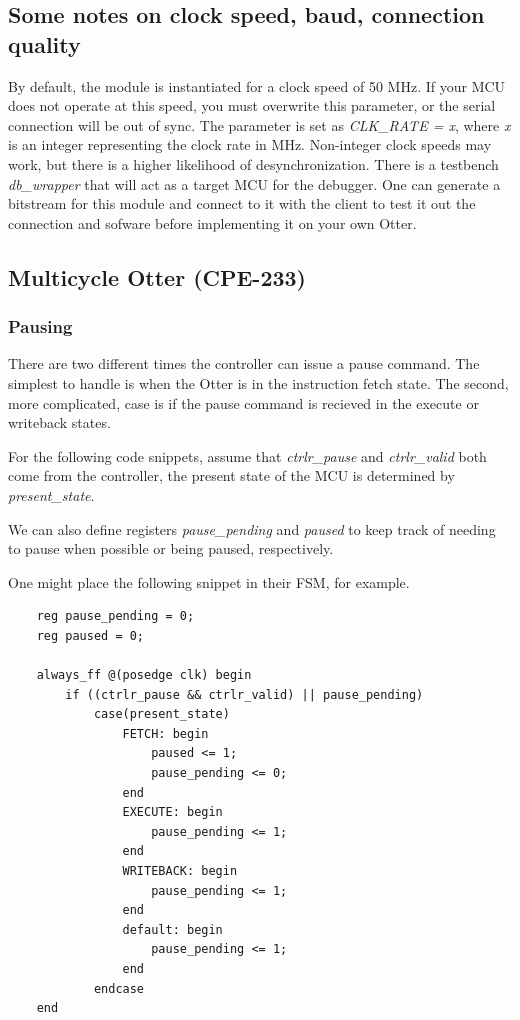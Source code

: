 \documentclass[10pt,a4paper]{article}
\begin{document}
\subsection{Some notes on clock speed, baud, connection quality}
By default, the module is instantiated for a clock speed of 50 MHz. If your MCU does not operate at
this speed, you must overwrite this parameter, or the serial connection will be out of sync. The
parameter is set as \emph{CLK\_RATE = x}, where \emph{x} is an integer representing the clock rate
in MHz. Non-integer clock speeds may work, but there is a higher likelihood of desynchronization.
There is a testbench \emph{db\_wrapper} that will act as a target MCU for the debugger. One can
generate a bitstream for this module and connect to it with the client to test it out the connection
and sofware before implementing it on your own Otter.

\subsection{Multicycle Otter (CPE-233)}

\subsubsection{Pausing}
There are two different times the controller can issue a pause command. The simplest to handle is
when the Otter is in the instruction fetch state. The second, more complicated, case is if the pause
command is recieved in the execute or writeback states.

For the following code snippets, assume that \emph{ctrlr\_pause} and \emph{ctrlr\_valid} both come from the
controller, the present state of the MCU is determined by \emph{present\_state}.

We can also define registers \emph{pause\_pending} and \emph{paused} to keep track of
needing to pause when possible or being paused, respectively.

One might place the following snippet in their FSM, for example.

\begin{verbatim}
    reg pause_pending = 0;
    reg paused = 0;

    always_ff @(posedge clk) begin
        if ((ctrlr_pause && ctrlr_valid) || pause_pending)
            case(present_state)
                FETCH: begin
                    paused <= 1;
                    pause_pending <= 0;
                end
                EXECUTE: begin
                    pause_pending <= 1;
                end
                WRITEBACK: begin
                    pause_pending <= 1;
                end
                default: begin
                    pause_pending <= 1;
                end
            endcase
    end
\end{verbatim}
\end{document}

